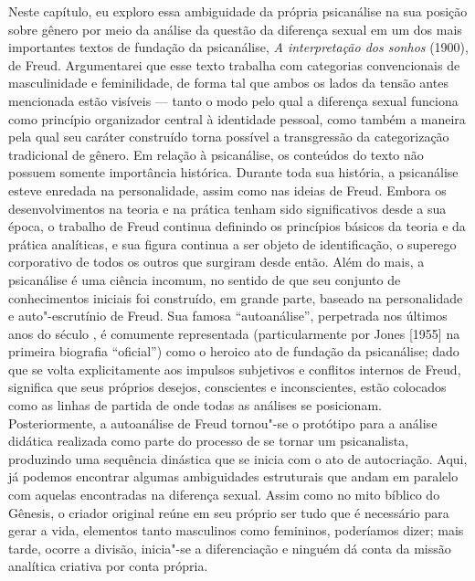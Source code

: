 Neste capítulo, eu exploro essa ambiguidade da própria psicanálise na
sua posição sobre gênero por meio da análise da questão da diferença
sexual em um dos mais importantes textos de fundação da psicanálise,
\emph{A interpretação dos sonhos} (1900), de Freud. Argumentarei que
esse texto trabalha com categorias convencionais de masculinidade e
feminilidade, de forma tal que ambos os lados da tensão antes mencionada
estão visíveis --- tanto o modo pelo qual a diferença sexual funciona
como princípio organizador central à identidade pessoal, como também a
maneira pela qual seu caráter construído torna possível a transgressão
da categorização tradicional de gênero. Em relação à psicanálise, os
conteúdos do texto não possuem somente importância histórica. Durante
toda sua história, a psicanálise esteve enredada na personalidade, assim
como nas ideias de Freud. Embora os desenvolvimentos na teoria e na
prática tenham sido significativos desde a sua época, o trabalho de
Freud continua definindo os princípios básicos da teoria e da prática
analíticas, e sua figura continua a ser objeto de identificação, o
superego corporativo de todos os outros que surgiram desde então. Além
do mais, a psicanálise é uma ciência incomum, no sentido de que seu
conjunto de conhecimentos iniciais foi construído, em grande parte,
baseado na personalidade e auto"-escrutínio de Freud. Sua famosa
``autoanálise'', perpetrada nos últimos anos do século , é comumente
representada (particularmente por Jones {[}1955{]} na primeira biografia
``oficial'') como o heroico ato de fundação da psicanálise; dado que se
volta explicitamente aos impulsos subjetivos e conflitos internos de
Freud, significa que seus próprios desejos, conscientes e inconscientes,
estão colocados como as linhas de partida de onde todas as análises se
posicionam. Posteriormente, a autoanálise de Freud tornou"-se o protótipo
para a análise didática realizada como parte do processo de se tornar um
psicanalista, produzindo uma sequência dinástica que se inicia com o ato
de autocriação. Aqui, já podemos encontrar algumas ambiguidades
estruturais que andam em paralelo com aquelas encontradas na diferença
sexual. Assim como no mito bíblico do Gênesis, o criador original reúne
em seu próprio ser tudo que é necessário para gerar a vida, elementos
tanto masculinos como femininos, poderíamos dizer; mais tarde, ocorre a
divisão, inicia"-se a diferenciação e ninguém dá conta da missão
analítica criativa por conta própria.


